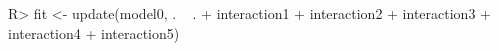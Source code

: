 \documentclass[article]{jss}
\begin{document}
\begin{Sinput}
R> fit <- update(model0, . ~ . + interaction1 + interaction2 + interaction3 + interaction4 + interaction5)
\end{Sinput}
\end{document}
